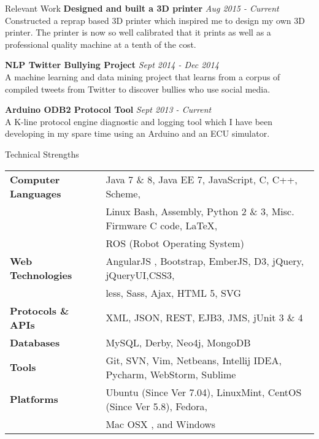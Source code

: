 \documentclass{resume} %
\begin{document}
\begin{rSection}{Relevant Work}
{\bf Designed and built a 3D printer} \hfill {\em Aug 2015 - Current} \\ 
Constructed a reprap based 3D printer which inspired me to design my own 3D printer. The printer is now so well calibrated that it prints as well as a professional quality machine at a tenth of the cost.

{\bf NLP Twitter Bullying Project} \hfill {\em Sept 2014 - Dec 2014} \\ 
A machine learning and data mining project that learns from a corpus of compiled tweets from Twitter to discover bullies who use social media.

{\bf Arduino ODB2 Protocol Tool} \hfill {\em Sept 2013 - Current} \\ 
A K-line protocol engine diagnostic and logging tool which I have been developing in my spare time using an Arduino and an ECU simulator.  \smallskip \\

\end{rSection}



\begin{rSection}{Technical Strengths}

\begin{tabular}{ @{} >{\bfseries}l @{\hspace{6ex}} l }
Computer Languages & Java 7 \& 8, Java EE 7, JavaScript, C, C++,  Scheme,\\
 					&  Linux Bash, Assembly, Python 2 \& 3, Misc. Firmware C code, \LaTeX,\\
 					&  ROS (Robot Operating System) \\
Web Technologies & AngularJS , Bootstrap, EmberJS, D3, jQuery, jQueryUI,CSS3,\\
				&  less, Sass, Ajax, HTML 5, SVG \\	
Protocols \& APIs & XML, JSON,  REST, EJB3, JMS, jUnit 3 \& 4 \\
         Databases & MySQL, Derby, Neo4j, MongoDB \\
			 Tools & Git, SVN, Vim, Netbeans, Intellij IDEA, Pycharm, WebStorm, Sublime \\
		 Platforms & Ubuntu (Since Ver 7.04), LinuxMint, CentOS (Since Ver 5.8), Fedora, \\
 & Mac OSX , and Windows \\
\end{tabular}

\end{rSection}
\end{document}
